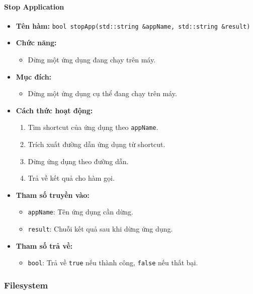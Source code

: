 \paragraph{Stop Application}
\begin{itemize}
    \item \textbf{Tên hàm:} \texttt{bool stopApp(std::string \&appName, std::string \&result)}
    \item \textbf{Chức năng:}
    \begin{itemize}
        \item Dừng một ứng dụng đang chạy trên máy.
    \end{itemize}
    \item \textbf{Mục đích:}
    \begin{itemize}
        \item Dừng một ứng dụng cụ thể đang chạy trên máy.
    \end{itemize}
    \item \textbf{Cách thức hoạt động:}
    \begin{enumerate}
        \item Tìm shortcut của ứng dụng theo \texttt{appName}.
        \item Trích xuất đường dẫn ứng dụng từ shortcut.
        \item Dừng ứng dụng theo đường dẫn.
        \item Trả về kết quả cho hàm gọi.
    \end{enumerate}
    \item \textbf{Tham số truyền vào:}
    \begin{itemize}
        \item \texttt{appName}: Tên ứng dụng cần dừng.
        \item \texttt{result}: Chuỗi kết quả sau khi dừng ứng dụng.
    \end{itemize}
    \item \textbf{Tham số trả về:}
    \begin{itemize}
        \item \texttt{bool}: Trả về \texttt{true} nếu thành công, \texttt{false} nếu thất bại.
    \end{itemize}
\end{itemize}

\subsubsection{Filesystem}
\label{subsec:filesystem}

